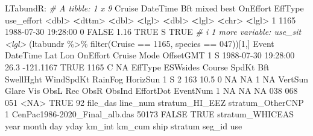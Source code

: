 \documentclass[
]{book}
\newenvironment{Shaded}{\begin{snugshade}}{\end{snugshade}}
\newcommand{\CommentTok}[1]{\textcolor[rgb]{0.56,0.35,0.01}{\textit{#1}}}
\newcommand{\ConstantTok}[1]{\textcolor[rgb]{0.00,0.00,0.00}{#1}}
\newcommand{\DecValTok}[1]{\textcolor[rgb]{0.00,0.00,0.81}{#1}}
\newcommand{\ErrorTok}[1]{\textcolor[rgb]{0.64,0.00,0.00}{\textbf{#1}}}
\newcommand{\FloatTok}[1]{\textcolor[rgb]{0.00,0.00,0.81}{#1}}
\newcommand{\FunctionTok}[1]{\textcolor[rgb]{0.00,0.00,0.00}{#1}}
\newcommand{\NormalTok}[1]{#1}
\newcommand{\SpecialCharTok}[1]{\textcolor[rgb]{0.00,0.00,0.00}{#1}}
\newcommand{\StringTok}[1]{\textcolor[rgb]{0.31,0.60,0.02}{#1}}
\begin{document}
\begin{Shaded}
\begin{Highlighting}[]
\NormalTok{LTabundR}\SpecialCharTok{:}
\CommentTok{\# A tibble: 1 x 9}
\NormalTok{  Cruise DateTime              Bft mixed  best OnEffort EffType use\_effort}
   \SpecialCharTok{\textless{}}\NormalTok{dbl}\SpecialCharTok{\textgreater{}} \ErrorTok{\textless{}}\NormalTok{dttm}\SpecialCharTok{\textgreater{}}              \ErrorTok{\textless{}}\NormalTok{dbl}\SpecialCharTok{\textgreater{}} \ErrorTok{\textless{}}\NormalTok{lgl}\SpecialCharTok{\textgreater{}} \ErrorTok{\textless{}}\NormalTok{dbl}\SpecialCharTok{\textgreater{}} \ErrorTok{\textless{}}\NormalTok{lgl}\SpecialCharTok{\textgreater{}}    \ErrorTok{\textless{}}\NormalTok{chr}\SpecialCharTok{\textgreater{}}   \ErrorTok{\textless{}}\NormalTok{lgl}\SpecialCharTok{\textgreater{}}     
\DecValTok{1}   \DecValTok{1165} \DecValTok{1988{-}07{-}30} \DecValTok{19}\SpecialCharTok{:}\DecValTok{28}\SpecialCharTok{:}\DecValTok{00}     \DecValTok{0} \ConstantTok{FALSE}  \FloatTok{1.16} \ConstantTok{TRUE}\NormalTok{     S       }\ConstantTok{TRUE}      
\CommentTok{\# i 1 more variable: use\_sit \textless{}lgl\textgreater{}}
\NormalTok{(ltabundr }\SpecialCharTok{\%\textgreater{}\%} \FunctionTok{filter}\NormalTok{(Cruise }\SpecialCharTok{==} \DecValTok{1165}\NormalTok{, species }\SpecialCharTok{==} \StringTok{\textquotesingle{}047\textquotesingle{}}\NormalTok{))[}\DecValTok{1}\NormalTok{,]}
\NormalTok{  Event            DateTime  Lat       Lon OnEffort Cruise Mode OffsetGMT}
\DecValTok{1}\NormalTok{     S }\DecValTok{1988{-}07{-}30} \DecValTok{19}\SpecialCharTok{:}\DecValTok{28}\SpecialCharTok{:}\DecValTok{00} \FloatTok{26.3} \SpecialCharTok{{-}}\FloatTok{121.1167}     \ConstantTok{TRUE}   \DecValTok{1165}\NormalTok{    C        }\ConstantTok{NA}
\NormalTok{  EffType ESWsides Course SpdKt Bft SwellHght WindSpdKt RainFog HorizSun}
\DecValTok{1}\NormalTok{       S        }\DecValTok{2}    \DecValTok{163}  \FloatTok{10.5}   \DecValTok{0}        \ConstantTok{NA}        \ConstantTok{NA}       \DecValTok{1}       \ConstantTok{NA}
\NormalTok{  VertSun Glare Vis ObsL Rec ObsR ObsInd EffortDot EventNum}
\DecValTok{1}      \ConstantTok{NA}    \ConstantTok{NA}  \ConstantTok{NA}  \DecValTok{038} \DecValTok{068}  \DecValTok{051}   \SpecialCharTok{\textless{}}\ConstantTok{NA}\SpecialCharTok{\textgreater{}}      \ConstantTok{TRUE}       \DecValTok{92}
\NormalTok{                       file\_das line\_num stratum\_HI\_EEZ stratum\_OtherCNP}
\DecValTok{1}\NormalTok{ CenPac1986}\SpecialCharTok{{-}}\NormalTok{2020\_Final\_alb.das    }\DecValTok{50173}          \ConstantTok{FALSE}             \ConstantTok{TRUE}
\NormalTok{  stratum\_WHICEAS year month day yday km\_int   km\_cum ship  stratum seg\_id  use}

\end{Highlighting}
\end{Shaded}
\end{document}
